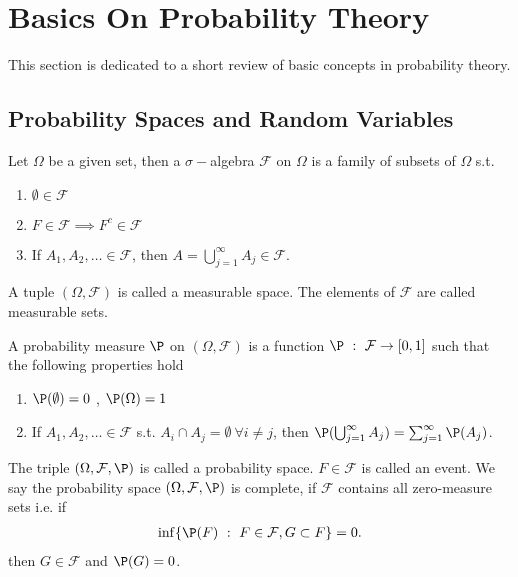 \section{Basics On Probability Theory}
This section is dedicated to a short review of basic concepts 
in probability theory.
\subsection{Probability Spaces and Random Variables}
\begin{definition}
 Let $\Omega $  be a given set, then a $\sigma-$algebra $\mathcal{F}$ on $\Omega $ is a
 family of subsets of $\Omega $ s.t.
 \begin{enumerate}
   \item $\emptyset \in  \mathcal{F}$
   \item $F \in  \mathcal{F} \implies F^{c} \in  \mathcal{F} $
   \item If $A_{1},A_{2},\ldots \in \mathcal{F}$, then $  A = \bigcup_{j=1}^{\infty} A_j \in \mathcal{F}$.
 \end{enumerate}
\end{definition}
\begin{definition}
 A tuple $(\Omega ,\mathcal{F})$  is called a measurable space. The elements of $\mathcal{F}$ are 
 called measurable sets. 
\end{definition}
\begin{definition}
 A probability measure $\P$ on $(\Omega ,\mathcal{F})$  is a function 
$ \P \ : \ \mathcal{F} \to [0,1]$ such that the following properties hold
 \begin{enumerate}
   \item $\P(\emptyset) = 0$ , $\P(\Omega ) = 1$
   \item If $A_{1},A_{2},\ldots \in \mathcal{F}$ s.t. $A_i \cap A_j = \emptyset \ \forall  i \neq j$,  then
    $\P(\bigcup_{j=1}^{\infty} A_j ) = \sum_{j=1}^{\infty} \P(A_j)$.
 \end{enumerate}
\end{definition}
\begin{definition}
 The triple $(\Omega ,\mathcal{F},\P)$  is called a probability space. $F \in  \mathcal{F}$ is called an
 event. We say the probability space $(\Omega ,\mathcal{F},\P)$ is complete, if $\mathcal{F}$ contains all zero-measure sets i.e.
 if 
 \begin{align*}
  \inf \{\P(F) \ : \ F \in  \mathcal{F},G \subset  F\}  = 0
 .\end{align*}
 then $G \in  \mathcal{F}$ and $\P(G) = 0$.
\end{definition} 
